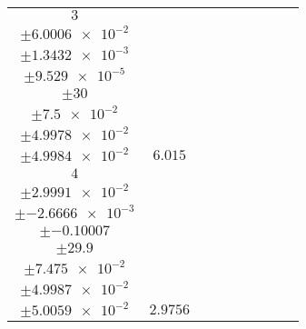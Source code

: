 \documentclass[8pt]{article}
\begin{document}
\begin{longtable}[l]{c c c c c c c c c}
$\num{3}$ & \begin{tabular}[c]{@{}c@{}}$\num{6.0006}$ \\ $\pm\num{6.0006e-2}$\end{tabular} & \begin{tabular}[c]{@{}c@{}}$\num{0.13432}$ \\ $\pm\num{1.3432e-3}$\end{tabular} & \begin{tabular}[c]{@{}c@{}}$\num{9.529e-3}$ \\ $\pm\num{9.529e-5}$\end{tabular} & \begin{tabular}[c]{@{}c@{}}$\num{3e+3}$ \\ $\pm\num{30}$\end{tabular} & \begin{tabular}[c]{@{}c@{}}$\num{7.5}$ \\ $\pm\num{7.5e-2}$\end{tabular} & \begin{tabular}[c]{@{}c@{}}$\num{4.9978}$ \\ $\pm\num{4.9978e-2}$\end{tabular} & \begin{tabular}[c]{@{}c@{}}$\num{4.9984}$ \\ $\pm\num{4.9984e-2}$\end{tabular} & $\num{6.015}$\\
$\num{4}$ & \begin{tabular}[c]{@{}c@{}}$\num{2.9991}$ \\ $\pm\num{2.9991e-2}$\end{tabular} & \begin{tabular}[c]{@{}c@{}}$\num{-0.26666}$ \\ $\pm\num{-2.6666e-3}$\end{tabular} & \begin{tabular}[c]{@{}c@{}}$\num{-10.007}$ \\ $\pm\num{-0.10007}$\end{tabular} & \begin{tabular}[c]{@{}c@{}}$\num{2.99e+3}$ \\ $\pm\num{29.9}$\end{tabular} & \begin{tabular}[c]{@{}c@{}}$\num{7.475}$ \\ $\pm\num{7.475e-2}$\end{tabular} & \begin{tabular}[c]{@{}c@{}}$\num{4.9987}$ \\ $\pm\num{4.9987e-2}$\end{tabular} & \begin{tabular}[c]{@{}c@{}}$\num{5.0059}$ \\ $\pm\num{5.0059e-2}$\end{tabular} & $\num{2.9756}$\\

\end{longtable}
\end{document}
